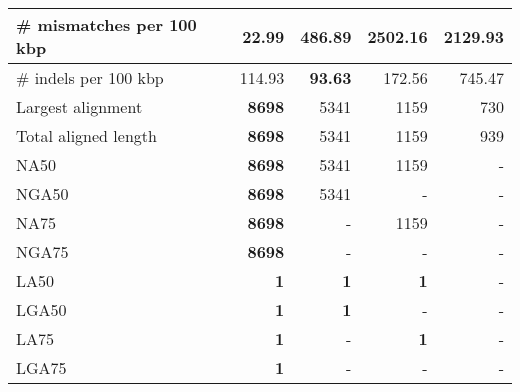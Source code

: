 \documentclass[12pt,a4paper]{article}
\begin{document}
\begin{table}[ht]
\begin{center}
\begin{tabular}{|l*{4}{|r}|}
\# mismatches per 100 kbp & {\bf 22.99} & 486.89 & 2502.16 & 2129.93 \\ \hline
\# indels per 100 kbp & 114.93 & {\bf 93.63} & 172.56 & 745.47 \\ \hline
Largest alignment & {\bf 8698} & 5341 & 1159 & 730 \\ \hline
Total aligned length & {\bf 8698} & 5341 & 1159 & 939 \\ \hline
NA50 & {\bf 8698} & 5341 & 1159 & - \\ \hline
NGA50 & {\bf 8698} & 5341 & - & - \\ \hline
NA75 & {\bf 8698} & - & 1159 & - \\ \hline
NGA75 & {\bf 8698} & - & - & - \\ \hline
LA50 & {\bf 1} & {\bf 1} & {\bf 1} & - \\ \hline
LGA50 & {\bf 1} & {\bf 1} & - & - \\ \hline
LA75 & {\bf 1} & - & {\bf 1} & - \\ \hline
LGA75 & {\bf 1} & - & - & - \\ \hline
\end{tabular}
\end{center}
\end{table}
\end{document}
